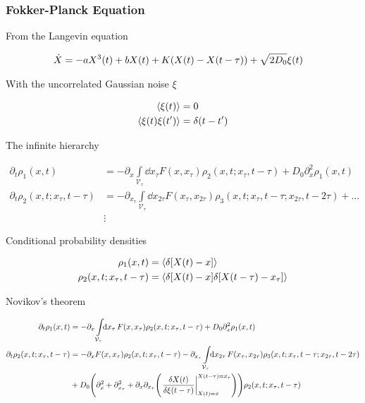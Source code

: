 \documentclass[a4paper,10pt]{article}
\newcommand{\intl}{\int\limits}
\begin{document}
\subsubsection*{Fokker-Planck Equation}

From the Langevin equation

\begin{align}
	\dot{X}
	&=
	-
	a
	X^3(t)
	+
	b
	X(t)
	+
	K
	\pqty{X(t)-X(t-\tau)}
	+
	\sqrt{2D_0}
	\xi(t)
\end{align} 

With the uncorrelated Gaussian noise $\xi$

\begin{align}
	\expval{\xi(t)}
	&=
	0
\\
	\expval{
		\xi(t)
		\xi(t^\prime)
	}
	&=
	\delta(t-t^\prime)
\end{align}

The infinite hierarchy

\begin{align}
	\partial_t
	\rho_1(x,t)
	&=
	-
	\partial_x
	\intl_{\mathcal{V}_\tau}
	\!\!
	\dd{x_\tau}
	F(x,x_\tau)
	\rho_2
	(x,t;x_\tau,t-\tau)
	+
	D_0
	\partial_x^2
	\rho_1(x,t)
\\
	\partial_t
	\rho_2(x,t;x_\tau,t-\tau)
	&=
	-\partial_{x_\tau}
	\intl_{\mathcal{V}_\tau}
	\!\!
	\dd{x_{2\tau}}
	F(x_\tau,x_{2\tau})
	\rho_3
	(x,t;x_\tau,t-\tau;x_{2\tau},t-2\tau)
	+
	\ldots
\\
	&\vdots
\end{align}

Conditional probability densities

\begin{align}
	\rho_1(x,t)
	&=
	\expval{\delta\bqty{X(t)-x}}
\\
	\rho_2(x,t;x_\tau,t-\tau)
	&=
	\expval{
		\delta\bqty{X(t)-x}
		\delta\bqty{X(t-\tau)-x_\tau}
	}
\end{align}

Novikov's theorem

\begin{align}
	\partial_t
	\rho_1(x,t)
	&=
	-\partial_x
	\intl_{\mathcal{V}_\tau}
	\!\!
	\dd{x_\tau}
	F(x,x_\tau)
	\rho_2
	(x,t;x_\tau,t-\tau)
	+
	D_0
	\partial_x^2
	\rho_1(x,t)
\\
	\partial_t
	\rho_2(x,t;x_\tau,t-\tau)
	&=
	-
	\partial_{x}
	F(x,x_\tau)
	\rho_2(x,t;x_\tau,t-\tau)
	-
	\partial_{x_\tau}
	\intl_{\mathcal{V}_\tau}
	\!\!
	\dd{x_{2\tau}}
	F(x_\tau,x_{2\tau})
	\rho_3
	(x,t;x_\tau,t-\tau;x_{2\tau},t-2\tau)
\\
	&+
	D_0
	\pqty{
		\partial_x^2
		+
		\partial_{x_\tau}^2
		+
		\partial_x
		\partial_{x_\tau}
		\pqty{
			\eval{\frac{\delta X(t)}{\delta\xi(t-\tau)}}_{
				X(t)=x
			}^{X(t-\tau)=x_{\tau}}
		}
	}
	\rho_2(x,t;x_\tau,t-\tau)
\end{align}
\end{document}
